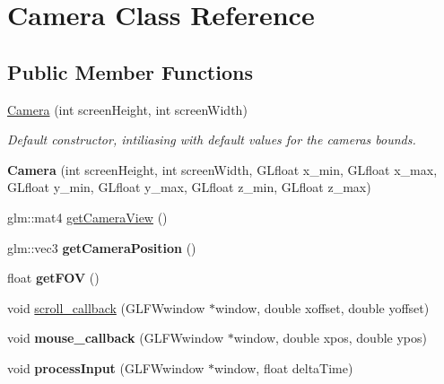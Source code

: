 \hypertarget{classCamera}{}\section{Camera Class Reference}
\label{classCamera}
\subsection*{Public Member Functions}
\begin{DoxyCompactItemize}
\item 
\hyperlink{classCamera_adc833c6c0b3f5cd2555d6753a7d974b1}{Camera} (int screen\+Height, int screen\+Width)\hypertarget{classCamera_adc833c6c0b3f5cd2555d6753a7d974b1}{}\label{classCamera_adc833c6c0b3f5cd2555d6753a7d974b1}

\begin{DoxyCompactList}\small\item\em Default constructor, intiliasing with default values for the camera\textquotesingle{}s bounds. \end{DoxyCompactList}\item 
{\bfseries Camera} (int screen\+Height, int screen\+Width, G\+Lfloat x\+\_\+min, G\+Lfloat x\+\_\+max, G\+Lfloat y\+\_\+min, G\+Lfloat y\+\_\+max, G\+Lfloat z\+\_\+min, G\+Lfloat z\+\_\+max)\hypertarget{classCamera_aa589a05bc671c6912a64d1887a9319c0}{}\label{classCamera_aa589a05bc671c6912a64d1887a9319c0}

\item 
glm\+::mat4 \hyperlink{classCamera_ae6804f73d19d0bc309699e60ea22bb0b}{get\+Camera\+View} ()
\item 
glm\+::vec3 {\bfseries get\+Camera\+Position} ()\hypertarget{classCamera_a4fafd54232cf9e6ed67b26fd5b63ba12}{}\label{classCamera_a4fafd54232cf9e6ed67b26fd5b63ba12}

\item 
float {\bfseries get\+F\+OV} ()\hypertarget{classCamera_a5ec1871e6f296d8528e64157c6371c09}{}\label{classCamera_a5ec1871e6f296d8528e64157c6371c09}

\item 
void \hyperlink{classCamera_afe7b8e7729cf2ac9aa76618b3134e39d}{scroll\+\_\+callback} (G\+L\+F\+Wwindow $\ast$window, double xoffset, double yoffset)
\item 
void {\bfseries mouse\+\_\+callback} (G\+L\+F\+Wwindow $\ast$window, double xpos, double ypos)\hypertarget{classCamera_ae9bac42cc36d4f19ee6a9ff842d7e837}{}\label{classCamera_ae9bac42cc36d4f19ee6a9ff842d7e837}

\item 
void {\bfseries process\+Input} (G\+L\+F\+Wwindow $\ast$window, float delta\+Time)\hypertarget{classCamera_a0b3e45d6edfc191080feb48e0887c05e}{}\label{classCamera_a0b3e45d6edfc191080feb48e0887c05e}

\end{DoxyCompactItemize}


